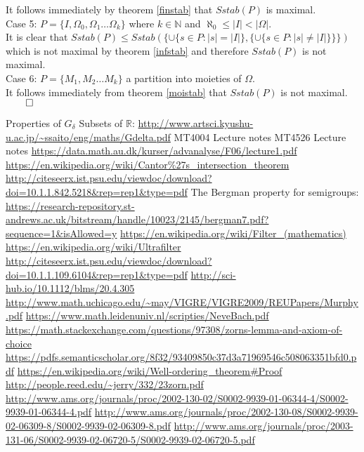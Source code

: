 \documentclass{report}
\begin{document}
It follows immediately by theorem \ref{finstab} that $Sstab(P)$ is maximal.\\
Case 5: $P=\{I,\Omega_0,\Omega_1 \ldots \Omega_k\}$ where $k \in \mathbb{N}$ and $\aleph_0 \leq \vert I \vert < \vert \Omega \vert$.\\
It is clear that $Sstab(P)\leq Sstab(\{\cup\{s \in P:\vert s \vert = \vert I \vert\},\{\cup\{s \in P:\vert s \vert \neq \vert I \vert\}\}\})$ which is not maximal by theorem \ref{infstab} and therefore $Sstab(P)$ is not maximal.\\
Case 6: $P=\{M_1,M_2 \ldots M_k\}$ a partition into moieties of $\Omega$.\\
It follows immediately from theorem \ref{moistab} that $Sstab(P)$ is not maximal. $\qed$
\begin{thebibliography}{3}
    Properties of $G_\delta$ Subsets of $\mathbb{R}$: \url{http://www.artsci.kyushu-u.ac.jp/~ssaito/eng/maths/Gdelta.pdf}
   MT4004 Lecture notes
   MT4526 Lecture notes
  \bibitem{}
   \url{https://data.math.au.dk/kurser/advanalyse/F06/lecture1.pdf}
        \bibitem{}
   \url{   https://en.wikipedia.org/wiki/Cantor%27s_intersection_theorem}
   \url{http://citeseerx.ist.psu.edu/viewdoc/download?doi=10.1.1.842.5218&rep=rep1&type=pdf}
        The Bergman property for semigroups: \url{https://research-repository.st-andrews.ac.uk/bitstream/handle/10023/2145/bergman7.pdf?sequence=1&isAllowed=y}
        \url{https://en.wikipedia.org/wiki/Filter_(mathematics)}
        \url{https://en.wikipedia.org/wiki/Ultrafilter}
        \url{http://citeseerx.ist.psu.edu/viewdoc/download?doi=10.1.1.109.6104&rep=rep1&type=pdf}
        \url{http://sci-hub.io/10.1112/blms/20.4.305}
        \url{http://www.math.uchicago.edu/~may/VIGRE/VIGRE2009/REUPapers/Murphy.pdf}
        \url{https://www.math.leidenuniv.nl/scripties/NeveBach.pdf}
        \url{https://math.stackexchange.com/questions/97308/zorns-lemma-and-axiom-of-choice}
        \url{https://pdfs.semanticscholar.org/8f32/93409850c37d3a71969546c508063351bfd0.pdf}
        \url{https://en.wikipedia.org/wiki/Well-ordering_theorem#Proof}
        \url{http://people.reed.edu/~jerry/332/23zorn.pdf}
        \url{http://www.ams.org/journals/proc/2002-130-02/S0002-9939-01-06344-4/S0002-9939-01-06344-4.pdf}
\url{http://www.ams.org/journals/proc/2002-130-08/S0002-9939-02-06309-8/S0002-9939-02-06309-8.pdf}
\url{http://www.ams.org/journals/proc/2003-131-06/S0002-9939-02-06720-5/S0002-9939-02-06720-5.pdf}
\end{thebibliography}
\end{document}
